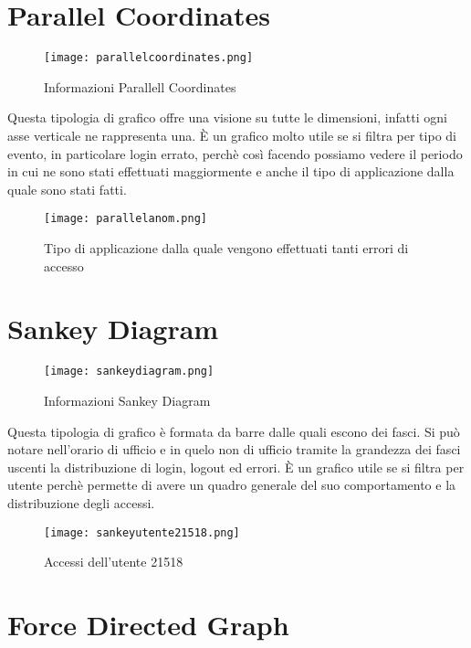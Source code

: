 \section{Parallel Coordinates}
\begin{figure}[H]
	\centering
	\texttt{[image: parallelcoordinates.png]}
	\caption{Informazioni Parallell Coordinates}
  \end{figure}
Questa tipologia di grafico offre una visione su tutte le dimensioni, infatti ogni asse verticale ne rappresenta una. È un grafico molto utile se si filtra per tipo di evento, in particolare login errato, perchè così facendo possiamo vedere il periodo in cui ne sono stati effettuati maggiormente e anche il tipo di applicazione dalla quale sono stati fatti.
\begin{figure}[H]
	\centering
	\texttt{[image: parallelanom.png]}
	\caption{Tipo di applicazione dalla quale vengono effettuati tanti errori di accesso}
  \end{figure}
\section{Sankey Diagram}
\begin{figure}[H]
	\centering
	\texttt{[image: sankeydiagram.png]}
	\caption{Informazioni Sankey Diagram}
  \end{figure}
Questa tipologia di grafico è formata da barre dalle quali escono dei fasci. Si può notare nell'orario di ufficio e in quelo non di ufficio tramite la grandezza dei fasci uscenti la distribuzione di login, logout ed errori. È un grafico utile se si filtra per utente perchè permette di avere un quadro generale del suo comportamento e la distribuzione degli accessi.
\begin{figure}[H]
	\centering
	\texttt{[image: sankeyutente21518.png]}
	\caption{Accessi dell'utente 21518}
  \end{figure}
\section{Force Directed Graph}
